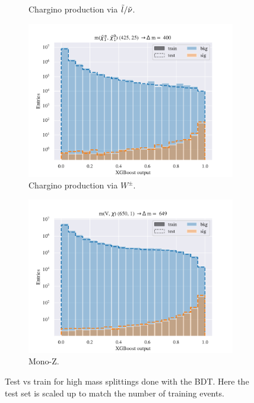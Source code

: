 \begin{figure}[H]
\begin{subfigure}[t!]{0.49\textwidth}
        \caption{Chargino production via $\Tilde{l}/\Tilde{\nu}$.}
        \label{fig:SlepsnuHigh}
    \end{subfigure}
    \begin{subfigure}[t!]{0.49\textwidth}
        \includegraphics[width = \textwidth]{Figures/WW/BDT/All_level/High/scaled_train_test_395330.pdf}
        \caption{Chargino production via $W^\pm$.}
        \label{fig:WWHigh}
    \end{subfigure}
    \begin{subfigure}[t!]{0.49\textwidth}
        \includegraphics[width = \textwidth]{Figures/Mono_Z/ML/BDT/All_level/High/scaled_train_test_310617.pdf}
        \caption{Mono-Z.}
        \label{fig:MonoZHigh}
    \end{subfigure}
    \caption{Test vs train for high mass splittings done with the BDT. Here the test set is scaled up to match the number of training events.}
    \label{fig:AllHighBDT}
\end{figure}

